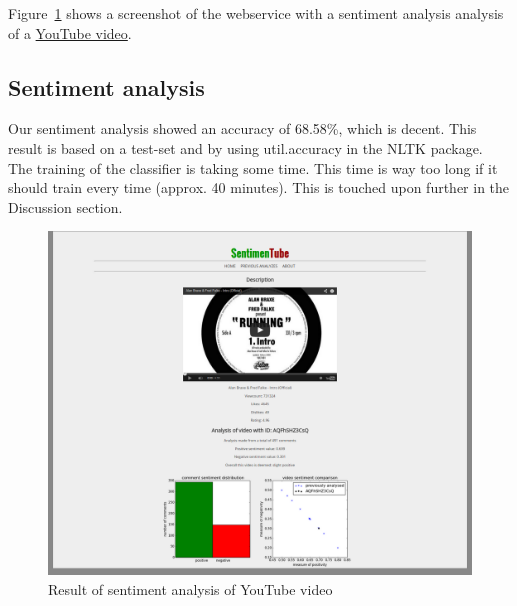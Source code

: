 \documentclass[conference]{IEEEtran}
\begin{document}
Figure~\ref{fig:videopage} shows a screenshot of the webservice
with a sentiment analysis analysis of a \href{https://www.youtube.com/watch?v=YESZ1S1zLW}{YouTube video}.\\

\subsection{Sentiment analysis}
Our sentiment analysis showed an accuracy of 68.58\%, which is decent. This result is based on a test-set and by using util.accuracy in the NLTK package. \\
The training of the classifier is taking some time. This time is way too long if it should train every time (approx. 40 minutes). This is touched upon further in the Discussion section. 
 
\begin{figure}[a]
\centering
\includegraphics[width=\columnwidth]{video.png}
\caption{Result of sentiment analysis of YouTube video}
\label{fig:videopage}
\end{figure}
\end{document}
